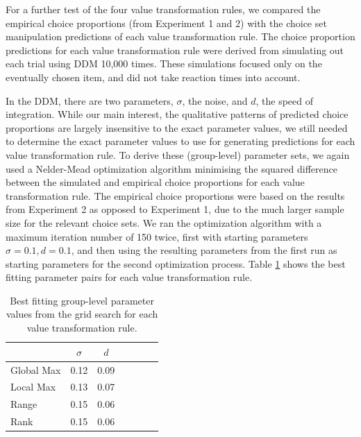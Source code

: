 \documentclass[11pt,a4paper]{article}
\begin{document}
For a further test of the four value transformation rules, we compared the empirical choice proportions (from Experiment 1 and 2) with the choice set manipulation predictions of each value transformation rule. The choice proportion predictions for each value transformation rule were derived from simulating out each trial using DDM 10,000 times. These simulations focused only on the eventually chosen item, and did not take reaction times into account.

In the DDM, there are two parameters, $\sigma$, the noise, and $d$, the speed of integration. While our main interest, the qualitative patterns of predicted choice proportions are largely insensitive to the exact parameter values, we still needed to determine the exact parameter values to use for generating predictions for each value transformation rule. To derive these (group-level) parameter sets, we again used a Nelder-Mead optimization algorithm minimising the squared difference between the simulated and empirical choice proportions for each value transformation rule.  The empirical choice proportions were based on the results from Experiment 2 as opposed to Experiment 1, due to the much larger sample size for the relevant choice sets. We ran the optimization algorithm with a maximum iteration number of 150 twice, first with starting parameters  $\sigma = 0.1, d = 0.1$, and then using the resulting parameters from the first run as starting parameters for the second optimization process. Table \ref{table:chap1res3} shows the best fitting parameter pairs for each value transformation rule. 

\begin{table}[htb!]
\centering
\caption{Best fitting group-level parameter values from the grid search for each value transformation rule.}
\begin{tabular}{lcccccc}
\toprule 
 & $\sigma$ & $d$ \\
\midrule
Global Max & 0.12 & 0.09  \\
Local Max & 0.13  & 0.07\\
Range & 0.15  & 0.06 \\
Rank & 0.15  & 0.06\\
\bottomrule
\end{tabular}
\label{table:chap1res3}
\end{table}


\FloatBarrier

\end{document}
